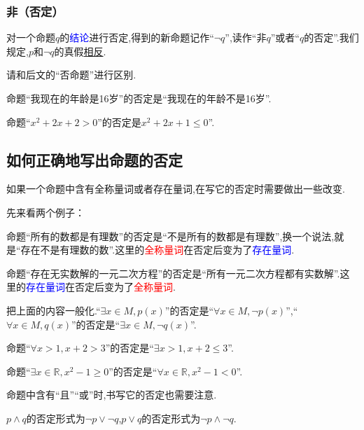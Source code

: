 \documentclass[lang=cn,math=cm,chinesefont=nofont,11pt,scheme=chinese,twocol]{elegantbook}
\begin{document}
\subsubsection{非（否定）}

对一个命题$q$的\textcolor{blue}{结论}进行否定,得到的新命题记作“$\neg q$”,读作“非$q$”或者“$q$的否定”.我们规定,$p$和$\neg q$的真假\underline{相反}.

\begin{remark}
  请和后文的“否命题”进行区别.
\end{remark}

\begin{example}
  命题“我现在的年龄是16岁”的否定是“我现在的年龄不是16岁”.
\end{example}

\begin{example}
  命题“$x^2+2x+2>0$”的否定是$x^2+2x+1\leq 0$”.
\end{example}

\subsection{如何正确地写出命题的否定}

如果一个命题中含有全称量词或者存在量词,在写它的否定时需要做出一些改变.

先来看两个例子：

命题“所有的数都是有理数”的否定是“不是所有的数都是有理数”,换一个说法,就是“存在不是有理数的数”.这里的\textcolor{red}{全称量词}在否定后变为了\textcolor{blue}{存在量词}.

命题“存在无实数解的一元二次方程”的否定是“所有一元二次方程都有实数解”.这里的\textcolor{blue}{存在量词}在否定后变为了\textcolor{red}{全称量词}.

把上面的内容一般化.“$\exists x\in M, p(x)$”的否定是“$\forall x{\in}M,\neg p(x)$”,“$\forall x\in M, q(x)$”的否定是“$\exists x{\in}M, \neg q(x)$”.

\begin{example}
  命题“$\forall x>1,x+2>3$”的否定是“$\exists x>1,x+2\leqslant 3$”.
\end{example}

\begin{example}
  命题“$\exists x\in\mathbb{R},x^2-1\geqslant 0$”的否定是“$\forall x\in\mathbb{R},x^2-1<0$”.
\end{example}

命题中含有“且”“或”时,书写它的否定也需要注意.

$p\land q$的否定形式为$\lnot p\lor \lnot q$,$p\lor q$的否定形式为$\lnot p\land \lnot q$.
\end{document}
